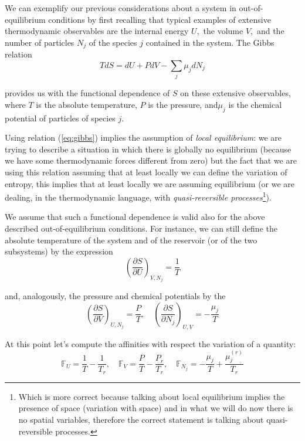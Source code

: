 \documentclass[\main/main.tex]{subfiles}
\begin{document}
We can exemplify our previous considerations about a system in out-of-equilibrium conditions by first recalling that typical examples of extensive thermodynamic observables are the internal energy $U,$ the volume $V,$ and the number of particles $N_{j}$ of the species $j$ contained in the system. The Gibbs relation
\begin{equation}
T d S=d U+P d V-\sum_{j} \mu_{j} d N_{j} 
\label{eq:gibbs}
\end{equation}

provides us with the functional dependence of $S$ on these extensive observables, where $T$ is
the absolute temperature, $P$ is the pressure, and$\mu_j$ is the chemical potential of particles of
species $j$.

Using relation (\ref{eq:gibbs}) implies the assumption of \textit{local equilibrium}: we are trying to describe a situation in which there is globally no equilibrium (because we have some thermodynamic forces different from zero) but the fact that we are using this relation assuming that at least locally we can define the variation of entropy, this implies that at least locally we are assuming equilibrium (or we are dealing, in the thermodynamic language, with \textit{quasi-reversible processes}\footnote{Which is more correct because talking about local equilibrium implies the presence of space (variation with space) and in what we will do now there is no spatial variables, therefore the correct statement is talking about quasi-reversible processes.}).


We assume that such a functional dependence is valid also for the above described out-of-equilibrium conditions. For instance, we can still define the absolute temperature of the system and of the reservoir (or of the two subsystems) by the expression
\begin{equation}
    \left(\frac{\partial S}{\partial U}\right)_{V, N_{j}}=\frac{1}{T}
\end{equation}

and, analogously, the pressure and chemical potentials by the 
\begin{equation}
    \left(\frac{\partial S}{\partial V}\right)_{U, N_{j}}=\frac{P}{T}, \quad\left(\frac{\partial S}{\partial N_{j}}\right)_{U, V}=-\frac{\mu_{j}}{T}
\end{equation}

At this point let's compute the affinities with respect the variation of a quantity:
\begin{equation}
    \mathbb{F}_{U}=\frac{1}{T}-\frac{1}{T_{r}}, \quad \mathbb{F}_{V}=\frac{P}{T}-\frac{P_{r}}{T_{r}}, \quad \mathbb{F}_{N_{j}}=-\frac{\mu_{j}}{T}+\frac{\mu_{j}^{(r)}}{T_{r}}
\end{equation}
\end{document}
